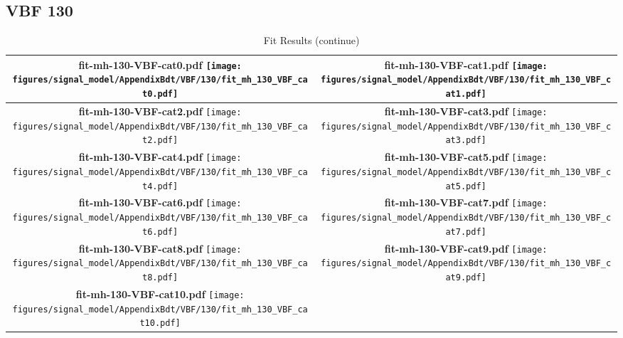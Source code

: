 \subsection{VBF 130}
\begin{longtable}{|c|c|}
\caption{Fit Results}
\endfirsthead
\caption{Fit Results (continue)}
\endhead
\hline
\parbox{0.47\textwidth}{
\centering
{\bfseries fit-mh-130-VBF-cat0.pdf}
\texttt{[image: figures/signal\_model/AppendixBdt/VBF/130/fit\_mh\_130\_VBF\_cat0.pdf]}
}
 & \parbox{0.47\textwidth}{
\centering
{\bfseries fit-mh-130-VBF-cat1.pdf}
\texttt{[image: figures/signal\_model/AppendixBdt/VBF/130/fit\_mh\_130\_VBF\_cat1.pdf]}
}
 \\
\hline
\parbox{0.47\textwidth}{
\centering
{\bfseries fit-mh-130-VBF-cat2.pdf}
\texttt{[image: figures/signal\_model/AppendixBdt/VBF/130/fit\_mh\_130\_VBF\_cat2.pdf]}
}
 & \parbox{0.47\textwidth}{
\centering
{\bfseries fit-mh-130-VBF-cat3.pdf}
\texttt{[image: figures/signal\_model/AppendixBdt/VBF/130/fit\_mh\_130\_VBF\_cat3.pdf]}
}
 \\
\hline
\parbox{0.47\textwidth}{
\centering
{\bfseries fit-mh-130-VBF-cat4.pdf}
\texttt{[image: figures/signal\_model/AppendixBdt/VBF/130/fit\_mh\_130\_VBF\_cat4.pdf]}
}
 & \parbox{0.47\textwidth}{
\centering
{\bfseries fit-mh-130-VBF-cat5.pdf}
\texttt{[image: figures/signal\_model/AppendixBdt/VBF/130/fit\_mh\_130\_VBF\_cat5.pdf]}
}
 \\
\hline
\parbox{0.47\textwidth}{
\centering
{\bfseries fit-mh-130-VBF-cat6.pdf}
\texttt{[image: figures/signal\_model/AppendixBdt/VBF/130/fit\_mh\_130\_VBF\_cat6.pdf]}
}
 & \parbox{0.47\textwidth}{
\centering
{\bfseries fit-mh-130-VBF-cat7.pdf}
\texttt{[image: figures/signal\_model/AppendixBdt/VBF/130/fit\_mh\_130\_VBF\_cat7.pdf]}
}
 \\
\hline
\parbox{0.47\textwidth}{
\centering
{\bfseries fit-mh-130-VBF-cat8.pdf}
\texttt{[image: figures/signal\_model/AppendixBdt/VBF/130/fit\_mh\_130\_VBF\_cat8.pdf]}
}
 & \parbox{0.47\textwidth}{
\centering
{\bfseries fit-mh-130-VBF-cat9.pdf}
\texttt{[image: figures/signal\_model/AppendixBdt/VBF/130/fit\_mh\_130\_VBF\_cat9.pdf]}
}
 \\
\hline
\parbox{0.47\textwidth}{
\centering
{\bfseries fit-mh-130-VBF-cat10.pdf}
\texttt{[image: figures/signal\_model/AppendixBdt/VBF/130/fit\_mh\_130\_VBF\_cat10.pdf]}
}
\end{longtable}

